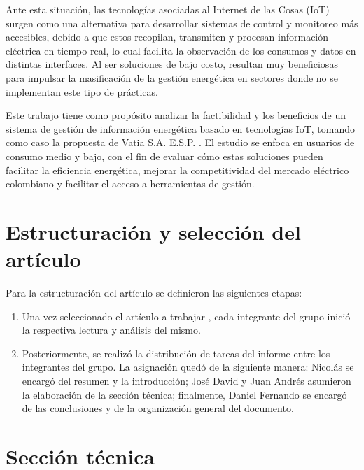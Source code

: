 Ante esta situación, las tecnologías asociadas al Internet de las Cosas (IoT) surgen como una alternativa para desarrollar sistemas de control y monitoreo más accesibles, debido a que estos recopilan, transmiten y procesan información eléctrica en tiempo real, lo cual facilita la observación de los consumos y datos en distintas interfaces. Al ser soluciones de bajo costo, resultan muy beneficiosas para impulsar la masificación de la gestión energética en sectores donde no se implementan este tipo de prácticas.

Este trabajo tiene como propósito analizar la factibilidad y los beneficios de un sistema de gestión de información energética basado en tecnologías IoT, tomando como caso la propuesta de Vatia S.A. E.S.P. \cite{Jaramillo2022}. El estudio se enfoca en usuarios de consumo medio y bajo, con el fin de evaluar cómo estas soluciones pueden facilitar la eficiencia energética, mejorar la competitividad del mercado eléctrico colombiano y facilitar el acceso a herramientas de gestión.

\section{Estructuración y selección del artículo}

Para la estructuración del artículo se definieron las siguientes etapas:

\begin{enumerate}
    \item Una vez seleccionado el artículo a trabajar \cite{Jaramillo2022}, cada integrante del grupo inició la respectiva lectura y análisis del mismo.
    \item Posteriormente, se realizó la distribución de tareas del informe entre los integrantes del grupo. La asignación quedó de la siguiente manera: Nicolás se encargó del resumen y la introducción; José David y Juan Andrés asumieron la elaboración de la sección técnica; finalmente, Daniel Fernando se encargó de las conclusiones y de la organización general del documento.
\end{enumerate}

\section{Sección técnica}

